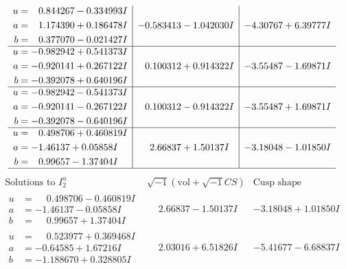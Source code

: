 \documentclass[1p]{elsarticle_modified}
\theoremstyle{definition}
\newcommand{\I}{\sqrt{-1}}
\begin{document}
$$\begin{array}{c|c|c}
\begin{aligned}
u &= \phantom{-}0.844267 - 0.334993 I \\
a &= \phantom{-}1.174390 + 0.186478 I \\
b &= \phantom{-}0.377070 - 0.021427 I\end{aligned}
 & -0.583413 - 1.042030 I & -4.30767 + 6.39777 I \\ \hline\begin{aligned}
u &= -0.982942 + 0.541373 I \\
a &= -0.920141 + 0.267122 I \\
b &= -0.392078 + 0.640196 I\end{aligned}
 & \phantom{-}0.100312 + 0.914322 I & -3.55487 - 1.69871 I \\ \hline\begin{aligned}
u &= -0.982942 - 0.541373 I \\
a &= -0.920141 - 0.267122 I \\
b &= -0.392078 - 0.640196 I\end{aligned}
 & \phantom{-}0.100312 - 0.914322 I & -3.55487 + 1.69871 I \\ \hline\begin{aligned}
u &= \phantom{-}0.498706 + 0.460819 I \\
a &= -1.46137 + 0.05858 I \\
b &= \phantom{-}0.99657 - 1.37404 I\end{aligned}
 & \phantom{-}2.66837 + 1.50137 I & -3.18048 - 1.01850 I\\
 \hline 
 \end{array}$$\newpage$$\begin{array}{c|c|c}  
\text{Solutions to }I^u_{2}& \I (\text{vol} + \sqrt{-1}CS) & \text{Cusp shape}\\
 \hline 
\begin{aligned}
u &= \phantom{-}0.498706 - 0.460819 I \\
a &= -1.46137 - 0.05858 I \\
b &= \phantom{-}0.99657 + 1.37404 I\end{aligned}
 & \phantom{-}2.66837 - 1.50137 I & -3.18048 + 1.01850 I \\ \hline\begin{aligned}
u &= \phantom{-}0.523977 + 0.369468 I \\
a &= -0.64585 + 1.67216 I \\
b &= -1.188670 + 0.328805 I\end{aligned}
 & \phantom{-}2.03016 + 6.51826 I & -5.41677 - 6.68837 I \\ \hline\begin{aligned}

\end{aligned}
\end{array}$$
\end{document}
